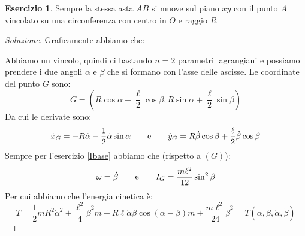 \documentclass[11pt,a4paper,twoside]{article}
\theoremstyle{definition}
\newtheorem{ese}{Esercizio}[section]
\newenvironment{sol}
	{\renewcommand\qedsymbol{$\blacksquare$}\begin{proof}[Soluzione]}
	{\end{proof}}
\begin{document}
\begin{ese}\label{122}
	Sempre la stessa asta $AB$ si muove sul piano $xy$ con il punto $A$ vincolato su una circonferenza con centro in $O$ e raggio $R$
\end{ese}
\begin{sol}
	Graficamente abbiamo che:
	\begin{center}
	\end{center}
	Abbiamo un vincolo, quindi ci bastando $n=2$ parametri lagrangiani e possiamo prendere i due angoli $\alpha$ e $\beta$ che si formano con l'asse delle ascisse.
	Le coordinate del punto $G$ sono:
	\[ G = \left( R \cos \alpha + \frac \ell 2 \cos \beta, R \sin \alpha + \frac \ell 2 \sin \beta \right) \]
	Da cui le derivate sono:
	\[ \dot x_G = -R \dot \alpha - \frac 12 \dot \alpha \sin \alpha \qquad \text e \qquad \dot y_G = R \dot \beta \cos \beta + \frac \ell 2 \dot \beta \cos \beta \]
	Sempre per l'esercizio \ref{Ibase} abbiamo che (rispetto a $(G)$):
	\[ \omega = \dot \beta \qquad \text e \qquad I_G = \frac{m \ell^2}{12}\sin^2 \beta\]
	Per cui abbiamo che l'energia cinetica è:
	\[ T = \frac 12 mR^2 \dot \alpha^2 + \frac {\ell^2}4 \dot\beta^2 m + R\ell \dot \alpha \dot \beta \cos(\alpha - \beta)m + \frac{m\ell^2}{24}\dot \beta^2 = T(\alpha, \beta, \dot \alpha, \dot \beta) \]
\end{sol}
\end{document}
